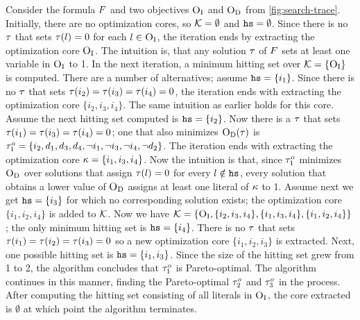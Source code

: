 \begin{example}
  Consider the formula $F$ and two objectives $\textsc{O}_{\text{I}}$ and $\textsc{O}_{\text{D}}$ from \cref{fig:search-trace}. 
  Initially, there are no optimization cores, so $\mathcal{K} = \emptyset$ and $\texttt{hs} = \emptyset$.
  Since there is no $\tau$ that sets $\tau(l) = 0$ for each $l \in \textsc{O}_{\text{I}}$, the iteration ends by extracting the optimization core $\textsc{O}_{\text{I}}$. 
  The intuition is, that any solution $\tau$ of $F$ sets at least one variable in $\textsc{O}_{\text{I}}$ to 1.
  In the next iteration, a minimum hitting set over $\mathcal{K} = \{ \textsc{O}_{\text{I}} \}$ is computed.
  There are a number of alternatives;
  assume $\texttt{hs} = \{ i_1 \}$.
  Since there is no $\tau$ that sets $\tau(i_2) = \tau(i_3) = \tau(i_4) = 0$, the iteration ends with extracting the optimization core $\{ i_2, i_3, i_4\}$.
  The same intuition as earlier holds for this core.
  Assume the next hitting set computed is $\texttt{hs} = \{i_2\}$.
  Now there is a $\tau$ that sets $\tau(i_1) = \tau(i_3) = \tau(i_4) = 0$;
  one that also minimizes $\textsc{O}_{\text{D}}(\tau)$ is $\tau^o_1 = \{i_2,\allowbreak d_1,\allowbreak d_3,\allowbreak d_4,\allowbreak \lnot i_1,\allowbreak \lnot i_3,\allowbreak \lnot i_4,\allowbreak \lnot d_2\}$.
  The iteration ends with extracting the optimization core $\kappa = \{i_1, i_3, i_4\}$.
  Now the intuition is that, since $\tau^o_1$ minimizes $\textsc{O}_{\text{D}}$ over solutions that assign $\tau(l) = 0$ for every $l \notin \texttt{hs}$, every solution that obtains a lower value of $\textsc{O}_{\text{D}}$ assigns at least one literal of $\kappa$ to 1. 
  Assume next we get $\texttt{hs} = \{i_3\}$ for which no corresponding solution exists;
  the optimization core $\{i_1, i_2, i_4\}$ is added to $\mathcal{K}$.
  Now we have $\mathcal{K} = \{ \textsc{O}_{\text{I}}, \{i_2, i_3, i_4\}, \{i_1, i_3, i_4\}, \{i_1, i_2, i_4\}\}$;
  the only minimum hitting set is $\texttt{hs} = \{ i_4 \}$.
  There is no $\tau$ that sets $\tau(i_1) = \tau(i_2) = \tau(i_3) = 0$ so a new optimization core $\{i_1, i_2, i_3\}$ is extracted. 
  Next, one possible hitting set is $\texttt{hs} = \{i_1, i_3\}$.
  Since the size of the hitting set grew from 1 to 2, the algorithm concludes that $\tau^o_1$ is Pareto-optimal. 
  The algorithm continues in this manner, finding the Pareto-optimal $\tau^o_2$ and $\tau^o_3$ in the process.
  After computing the hitting set consisting of all literals in $\textsc{O}_{\text{I}}$, the core extracted is $\emptyset$ at which point the algorithm terminates. 
\end{example}

